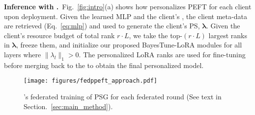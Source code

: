 \noindent\textbf{Inference with \method{}.}~Fig.~\ref{fig:intro}(a) shows how \method{} personalizes PEFT for each client upon deployment. Given the learned MLP and the client's \basemodel{},  the client meta-data are retrieved (Eq.~\ref{eq:mlp}) and used to generate the client's PS, $\bm{\lambda}$.  Given the client's resource budget of total rank $r \cdot L$, we take the top-$(r \cdot L)$ largest ranks in $\bm{\lambda}$, freeze them, and initialize our proposed BayesTune-LoRA modules for all layers where $\|\lambda_l\|_1$$>$$0$.  The personalized LoRA ranks are used for fine-tuning before merging back to the \basemodel{} to obtain the final personalized model.

\begin{figure}[t]
    \texttt{[image: figures/fedppeft\_approach.pdf]} 
    \vspace{-0.9cm}
    \caption{\method{}'s federated training of PSG for each federated round (See text in Section.~\ref{sec:main_method}).}
    \vspace{-0.5cm}
    \label{fig:approach}
    \vspace{-0.2cm}
\end{figure}





